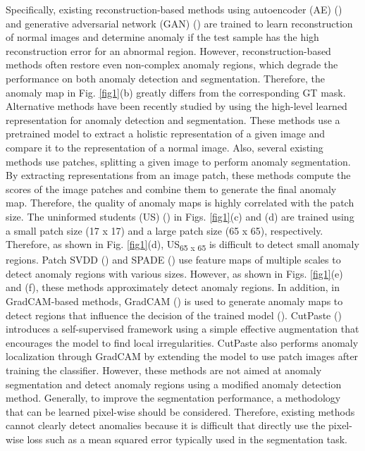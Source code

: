 \documentclass{article} \usepackage{iclr2022_conference,times}
\begin{document}
Specifically, existing reconstruction-based methods using autoencoder (AE) (\cite{re8,re9,re12,re10, mvtec}) and generative adversarial network (GAN) (\cite{re7,re11,anog,re14}) are trained to learn reconstruction of normal images and determine anomaly if the test sample has the high reconstruction error for an abnormal region. However, reconstruction-based methods often restore even non-complex anomaly regions, which degrade the performance on both anomaly detection and segmentation. Therefore, the anomaly map in Fig. \ref{fig1}(b) greatly differs from the corresponding GT mask. Alternative methods have been recently studied by using the high-level learned representation for anomaly detection and segmentation. These methods use a pretrained model to extract a holistic representation of a given image and compare it to the representation of a normal image. Also, several existing methods use patches, splitting a given image to perform anomaly segmentation. By extracting representations from an image patch, these methods compute the scores of the image patches and combine them to generate the final anomaly map. Therefore, the quality of anomaly maps is highly correlated with the patch size. The uninformed students (US) (\cite{stu}) in Figs. \ref{fig1}(c) and (d) are trained using a small patch size (17 x 17) and a large patch size (65 x 65), respectively. Therefore, as shown in Fig. \ref{fig1}(d), US\textsubscript{65 x 65} is difficult to detect small anomaly regions. Patch SVDD (\cite{patch}) and SPADE (\cite{spa}) use feature maps of multiple scales to detect anomaly regions with various sizes. However, as shown in Figs. \ref{fig1}(e) and (f), these methods approximately detect anomaly regions. In addition, in GradCAM-based methods, GradCAM (\cite{grad}) is used to generate anomaly maps to detect regions that influence the decision of the trained model (\cite {att,eatt}). CutPaste (\cite{cut}) introduces a self-supervised framework using a simple effective augmentation that encourages the model to find local irregularities. CutPaste also performs anomaly localization through GradCAM by extending the model to use patch images after training the classifier. However, these methods are not aimed at anomaly segmentation and detect anomaly regions using a modified anomaly detection method. Generally, to improve the segmentation performance, a methodology that can be learned pixel-wise should be considered. Therefore, existing methods cannot clearly detect anomalies because it is difficult that directly use the pixel-wise loss such as a mean squared error typically used in the segmentation task.
\end{document}
